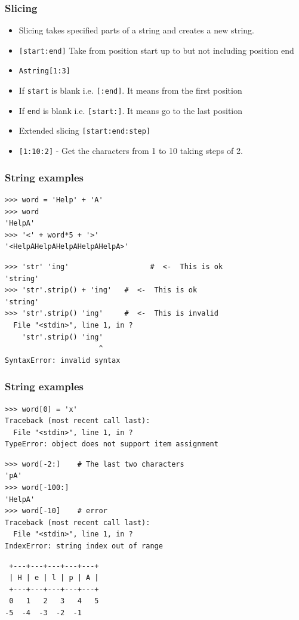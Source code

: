 \documentclass{beamer}
\begin{document}
\begin{frame}
\frametitle{Slicing}
\begin{itemize}
\item Slicing takes specified parts of a string and creates a new string.
\item \texttt{[start:end]} Take from position start up to but not including position end
\item \texttt{Astring[1:3]}
\item If \texttt{start} is blank i.e. \texttt{[:end]}. It means from the first position
\item If \texttt{end} is blank i.e. \texttt{[start:]}. It means go to the last position
\item Extended slicing \texttt{[start:end:step]}
\item \texttt{[1:10:2]} - Get the characters from 1 to 10 taking steps of 2.
\end{itemize}
\end{frame}

\begin{frame}[containsverbatim]
\frametitle{String examples}
\begin{lstlisting}
>>> word = 'Help' + 'A'
>>> word
'HelpA'
>>> '<' + word*5 + '>'
'<HelpAHelpAHelpAHelpAHelpA>'
\end{lstlisting}
\begin{lstlisting}
>>> 'str' 'ing'                   #  <-  This is ok
'string'
>>> 'str'.strip() + 'ing'   #  <-  This is ok
'string'
>>> 'str'.strip() 'ing'     #  <-  This is invalid
  File "<stdin>", line 1, in ?
    'str'.strip() 'ing'
                      ^
SyntaxError: invalid syntax
\end{lstlisting}
\end{frame}

\begin{frame}[containsverbatim]
\frametitle{String examples}
\begin{lstlisting}
>>> word[0] = 'x'
Traceback (most recent call last):
  File "<stdin>", line 1, in ?
TypeError: object does not support item assignment
\end{lstlisting}
\begin{lstlisting}
>>> word[-2:]    # The last two characters
'pA'
>>> word[-100:]
'HelpA'
>>> word[-10]    # error
Traceback (most recent call last):
  File "<stdin>", line 1, in ?
IndexError: string index out of range
\end{lstlisting}
\begin{Verbatim}
 +---+---+---+---+---+
 | H | e | l | p | A |
 +---+---+---+---+---+
 0   1   2   3   4   5
-5  -4  -3  -2  -1
\end{Verbatim}
\end{frame}
\end{document}
